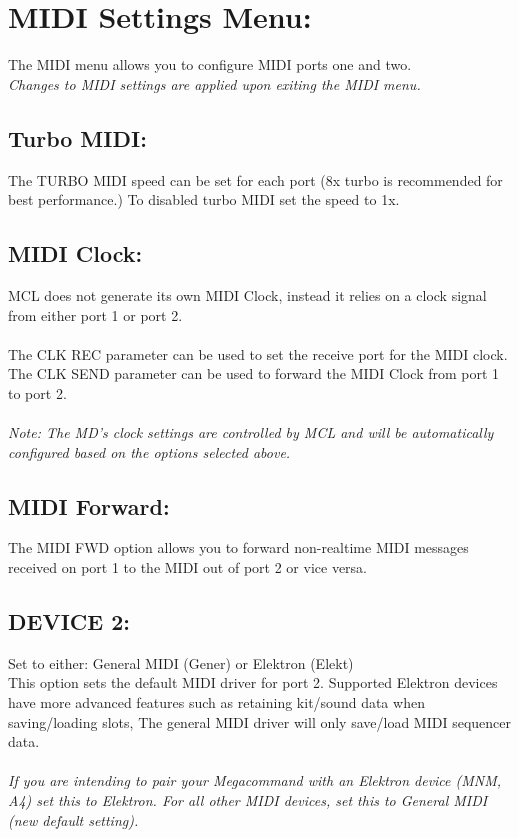 \chapter{MIDI Settings Menu:}
The MIDI menu allows you to configure MIDI ports one and two.
\\
\textit{Changes to MIDI settings are applied upon exiting the MIDI menu.}

\section{Turbo MIDI:}
The TURBO MIDI speed can be set for each port (8x turbo is recommended for best performance.) To disabled turbo MIDI set the speed to 1x.
\section{MIDI Clock:}
MCL does not generate its own MIDI Clock, instead it relies on a clock signal from either port 1 or port 2.\\\\
The CLK REC parameter can be used to set the receive port for the MIDI clock.\\
The CLK SEND parameter can be used to forward the MIDI Clock from port 1 to port 2.\\\\
\textit{Note: The MD's clock settings are controlled by MCL and will be automatically configured based on the options selected above.}

\section{MIDI Forward:}
The MIDI FWD option allows you to forward non-realtime MIDI messages received on port 1 to the MIDI out of port 2 or vice versa.
\section{DEVICE 2: }
Set to either: General MIDI (Gener) or Elektron (Elekt)\\

This option sets the default MIDI driver for port 2. Supported Elektron devices have
more advanced features such as retaining kit/sound data when saving/loading slots,
The general MIDI driver will only save/load MIDI sequencer data.\\
\\
\textit{If you are intending to pair your Megacommand with an Elektron device
(MNM, A4) set this to Elektron. For all other MIDI devices, set this to General MIDI (new default setting).}